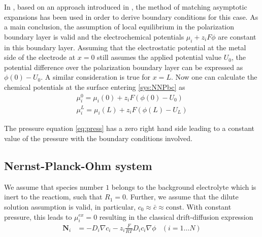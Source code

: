 \documentclass[12pt,oneside,reqno]{amsart}
\numberwithin{equation}{section}
\begin{document}
In \cite{guhlke2015theorie}, based on an approach introduced in \cite{caginalp1988dynamics}, the method
of matching asymptotic expansions has been used in order to derive boundary conditions for
this case. As a main conclusion, the assumption of local equilibrium 
in the polarization boundary layer is valid and 
the electrochemical potentials $\mu_i + z_i F \phi$ are constant in this boundary layer. Assuming that the electrostatic
potential at the metal side of the electrode at $x=0$ still assumes the applied potential value $U_0$, the
potential difference over the polarization boundary layer can be expressed as $\phi(0)-U_0$. A
similar consideration is true for $x=L$.
Now one can 
calculate the chemical potentials at the surface entering \eqref{sys:NNPbc} as
\begin{subequations}\label{sys:neubc}
   \begin{align}
     \mu_i^0=\mu_i(0) + z_i F(\phi(0)-U_0)\\
     \mu_i^L=\mu_i(L) + z_i F(\phi(L)-U_L)
   \end{align}
 \end{subequations}

 The pressure equation \eqref{eq:press} has a zero right hand side leading to a
 constant value of the pressure with the boundary conditions involved.

\subsection{Nernst-Planck-Ohm system}

We assume that species number $1$ belongs to the background electrolyte which
is inert to  the reactiom, such that $R_1=0$. Further, we assume that 
the dilute solution assumption is valid, in particular, $c_0\approx\bar c\approx \mathrm{const}$.
With constant pressure, this leads to $\mu_i^{ex}=0$ resulting in 
the classical drift-diffusion expression
\begin{align}
  \mathbf N_i &= -D_i \nabla c_i  - z_i \frac{F}{RT} D_i c_i \nabla \phi \label{eq:ddflux} & (i=1\dots N)
\end{align}
\end{document}
